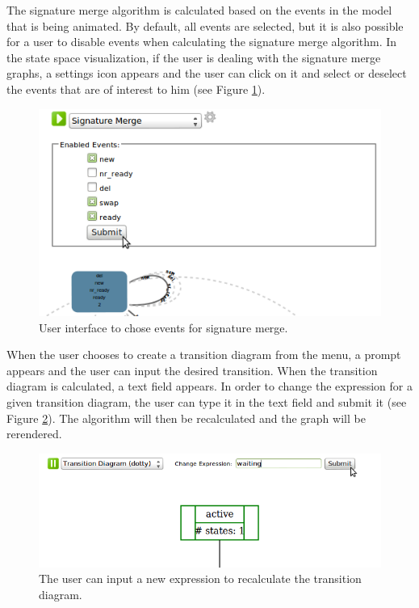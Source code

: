 The signature merge algorithm is calculated based on the events in the model that is being animated. By default, all events are selected, but it is also possible for a user to disable events when calculating the signature merge algorithm. In the state space visualization, if the user is dealing with the signature merge graphs, a settings icon appears and the user can click on it and select or deselect the events that are of interest to him (see Figure \ref{sigMergeUI}).  

\begin{figure}[h!]
\centering
\includegraphics[width=14cm]{bilder/sigMergeUI.png}
\caption{User interface to chose events for signature merge.}
\label{sigMergeUI}
\end{figure}

When the user chooses to create a transition diagram from the menu, a prompt appears and the user can input the desired transition. When the transition diagram is calculated, a text field appears. In order to change the expression for a given transition diagram, the user can type it in the text field and submit it (see Figure \ref{transDiagUI}). The algorithm will then be recalculated and the graph will be rerendered.

\begin{figure}[h!]
\centering
\includegraphics[width=14cm]{bilder/transDiag-UI.png}
\caption{The user can input a new expression to recalculate the transition diagram.}
\label{transDiagUI}
\end{figure}

